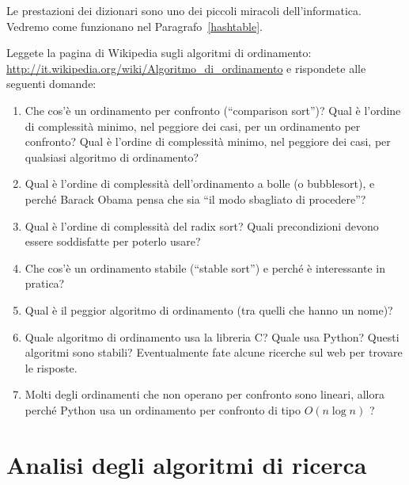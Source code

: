 \documentclass[10pt]{book}
\begin{document}
Le prestazioni dei dizionari sono uno dei piccoli miracoli dell'informatica. Vedremo come funzionano nel Paragrafo~\ref{hashtable}.

\vspace{0.2in}
\begin{exercise}

Leggete la pagina di Wikipedia sugli algoritmi di ordinamento:
\url{http://it.wikipedia.org/wiki/Algoritmo_di_ordinamento} e rispondete alle seguenti domande:

\begin{enumerate}

\item Che cos'è un ordinamento per confronto (``comparison sort'')? Qual è l'ordine di complessità minimo, nel peggiore dei casi, per un ordinamento per confronto? Qual è l'ordine di complessità minimo, nel peggiore dei casi, per qualsiasi algoritmo di ordinamento?

\item Qual è l'ordine di complessità dell'ordinamento a bolle (o bubblesort), e perché Barack Obama pensa che sia ``il modo sbagliato di procedere''?

\item Qual è l'ordine di complessità del radix sort? Quali precondizioni devono essere soddisfatte per poterlo usare?

\item Che cos'è un ordinamento stabile (``stable sort'') e perché è interessante in pratica?

\item Qual è il peggior algoritmo di ordinamento (tra quelli che hanno un nome)?

\item Quale algoritmo di ordinamento usa la libreria C? Quale usa Python? Questi algoritmi sono stabili? Eventualmente fate alcune ricerche sul web per trovare le risposte.

\item Molti degli ordinamenti che non operano per confronto sono lineari, allora perché Python usa un ordinamento per confronto di tipo $O(n \log n)$ ?

\end{enumerate}

\end{exercise}


\section{Analisi degli algoritmi di ricerca}
\end{document}
